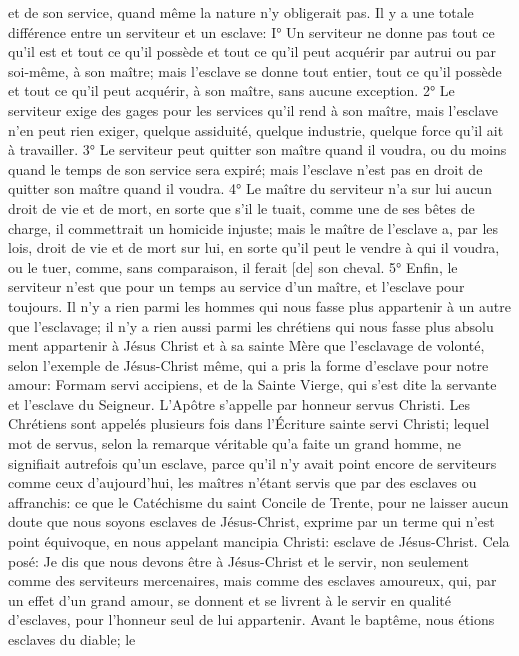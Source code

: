et de son service, quand même la nature n'y obligerait pas.
 Il y a une totale différence entre un serviteur et un esclave:
I° Un serviteur ne donne pas tout ce qu'il est et tout ce qu'il possède et tout ce qu'il peut acquérir par autrui ou par
soi-même, à son maître; mais l'esclave se donne tout entier, tout ce qu'il possède et tout ce qu'il peut acquérir, à
son maître, sans aucune exception.
2° Le serviteur exige des gages pour les services qu'il rend à son maître, mais l'esclave n'en peut rien exiger,
quelque assiduité, quelque industrie, quelque force qu'il ait à travailler.
3° Le serviteur peut quitter son maître quand il voudra, ou du moins quand le temps de son service sera expiré;
mais l'esclave n'est pas en droit de quitter son maître quand il voudra.
4° Le maître du serviteur n'a sur lui aucun droit de vie et de mort, en sorte que s'il le tuait, comme une de ses bêtes
de charge, il commettrait un homicide injuste; mais le maître de l'esclave a, par les lois, droit de vie et de mort sur
lui, en sorte qu'il peut le vendre à qui il voudra, ou le tuer, comme, sans comparaison, il ferait [de] son cheval.
5° Enfin, le serviteur n'est que pour un temps au service d'un maître, et l'esclave pour toujours.
 Il n'y a rien parmi les hommes qui nous fasse plus appartenir à un autre que l'esclavage; il n'y a rien aussi
parmi les chrétiens qui nous fasse plus absolu ment appartenir à Jésus Christ et à sa sainte Mère que l'esclavage
de volonté, selon l'exemple de Jésus-Christ même, qui a pris la forme d'esclave pour notre amour: Formam servi
accipiens, et de la Sainte Vierge, qui s'est dite la servante et l'esclave du Seigneur. L'Apôtre s'appelle par honneur
servus Christi. Les Chrétiens sont appelés plusieurs fois dans l'Écriture sainte servi Christi; lequel mot de servus,
selon la remarque véritable qu'a faite un grand homme, ne signifiait autrefois qu'un esclave, parce qu'il n'y avait
point encore de serviteurs comme ceux d'aujourd'hui, les maîtres n'étant servis que par des esclaves ou
affranchis: ce que le Catéchisme du saint Concile de Trente, pour ne laisser aucun doute que nous soyons
esclaves de Jésus-Christ, exprime par un terme qui n'est point équivoque, en nous appelant mancipia Christi:
esclave de Jésus-Christ. Cela posé:
 Je dis que nous devons être à Jésus-Christ et le servir, non seulement comme des serviteurs mercenaires,
mais comme des esclaves amoureux, qui, par un effet d'un grand amour, se donnent et se livrent à le servir en
qualité d'esclaves, pour l'honneur seul de lui appartenir. Avant le baptême, nous étions esclaves du diable; le
